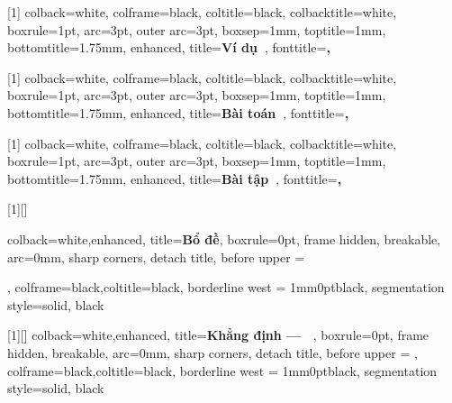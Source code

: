 [1]{
    colback=white,
    colframe=black,
    coltitle=black,
    colbacktitle=white,
    boxrule=1pt,
    arc=3pt,
    outer arc=3pt,
    boxsep=1mm,
    toptitle=1mm,
    bottomtitle=1.75mm,
    enhanced,
    title={\textbf{Ví dụ~\thetcbcounter}},
    fonttitle=\bfseries,
}

[1]{
    colback=white,
    colframe=black,
    coltitle=black,
    colbacktitle=white,
    boxrule=1pt,
    arc=3pt,
    outer arc=3pt,
    boxsep=1mm,
    toptitle=1mm,
    bottomtitle=1.75mm,
    enhanced,
    title={\textbf{Bài toán~\thetcbcounter}},
    fonttitle=\bfseries,
}

[1]{
    colback=white,
    colframe=black,
    coltitle=black,
    colbacktitle=white,
    boxrule=1pt,
    arc=3pt,
    outer arc=3pt,
    boxsep=1mm,
    toptitle=1mm,
    bottomtitle=1.75mm,
    enhanced,
    title={\textbf{Bài tập~\thetcbcounter}},
    fonttitle=\bfseries,
}

[1][]{
    colback=white,enhanced,
    title={\textbf{Bổ đề}},
    boxrule=0pt,
    frame hidden,
    breakable,
    arc=0mm,
    sharp corners,
    detach title,
    before upper = \tcbtitle\par\smallskip,
    colframe=black,coltitle=black,
    borderline west = {1mm}{0pt}{black},
    segmentation style={solid, black}
}

[1][]{
    colback=white,enhanced,
    title={\textbf{Khẳng định --- \ }},
    boxrule=0pt,
    frame hidden,
    breakable,
    arc=0mm,
    sharp corners,
    detach title,
    before upper = \tcbtitle,
    colframe=black,coltitle=black,
    borderline west = {1mm}{0pt}{black},
    segmentation style={solid, black}
}

\newenvironment{solution}[1][Lời giải]{%
  \proof[\normalfont \faPenNib \hspace{0.2cm} \ttfamily \scshape \large #1]%
}{\(\hfill \blacksquare\){\parfillskip0pt\par}}


\fancyhead[RO]{\footnotesize \thepage}
\fancyhead[LE]{\footnotesize \thepage}
\fancyhead[LO]{\footnotesize \scshape \leftmark}
\fancyfoot{}

\renewcommand{\headrulewidth}{0pt}
\renewcommand{\footrulewidth}{0pt}